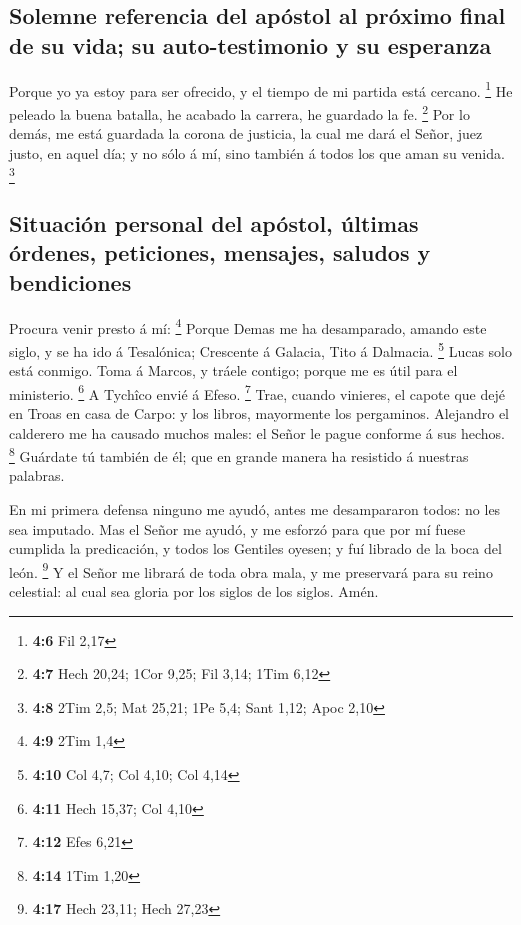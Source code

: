 \hypertarget{solemne-referencia-del-apuxf3stol-al-pruxf3ximo-final-de-su-vida-su-auto-testimonio-y-su-esperanza}{%
\subsection{Solemne referencia del apóstol al próximo final de su vida;
su auto-testimonio y su
esperanza}\label{solemne-referencia-del-apuxf3stol-al-pruxf3ximo-final-de-su-vida-su-auto-testimonio-y-su-esperanza}}

 Porque yo ya estoy para ser ofrecido, y el tiempo de mi
partida está cercano. \footnote{\textbf{4:6} Fil 2,17}  He
peleado la buena batalla, he acabado la carrera, he guardado la fe.
\footnote{\textbf{4:7} Hech 20,24; 1Cor 9,25; Fil 3,14; 1Tim 6,12}
 Por lo demás, me está guardada la corona de justicia, la
cual me dará el Señor, juez justo, en aquel día; y no sólo á mí, sino
también á todos los que aman su venida. \footnote{\textbf{4:8} 2Tim 2,5;
  Mat 25,21; 1Pe 5,4; Sant 1,12; Apoc 2,10}

\hypertarget{situaciuxf3n-personal-del-apuxf3stol-uxfaltimas-uxf3rdenes-peticiones-mensajes-saludos-y-bendiciones}{%
\subsection{Situación personal del apóstol, últimas órdenes, peticiones,
mensajes, saludos y
bendiciones}\label{situaciuxf3n-personal-del-apuxf3stol-uxfaltimas-uxf3rdenes-peticiones-mensajes-saludos-y-bendiciones}}

 Procura venir presto á mí: \footnote{\textbf{4:9} 2Tim 1,4}
 Porque Demas me ha desamparado, amando este siglo, y se ha
ido á Tesalónica; Crescente á Galacia, Tito á Dalmacia. \footnote{\textbf{4:10}
  Col 4,7; Col 4,10; Col 4,14}  Lucas solo está conmigo.
Toma á Marcos, y tráele contigo; porque me es útil para el ministerio.
\footnote{\textbf{4:11} Hech 15,37; Col 4,10}  A Tychîco
envié á Efeso. \footnote{\textbf{4:12} Efes 6,21}  Trae,
cuando vinieres, el capote que dejé en Troas en casa de Carpo: y los
libros, mayormente los pergaminos.  Alejandro el calderero
me ha causado muchos males: el Señor le pague conforme á sus hechos.
\footnote{\textbf{4:14} 1Tim 1,20}  Guárdate tú también de
él; que en grande manera ha resistido á nuestras palabras.

 En mi primera defensa ninguno me ayudó, antes me
desampararon todos: no les sea imputado.  Mas el Señor me
ayudó, y me esforzó para que por mí fuese cumplida la predicación, y
todos los Gentiles oyesen; y fuí librado de la boca del león.
\footnote{\textbf{4:17} Hech 23,11; Hech 27,23}  Y el Señor
me librará de toda obra mala, y me preservará para su reino celestial:
al cual sea gloria por los siglos de los siglos. Amén.

